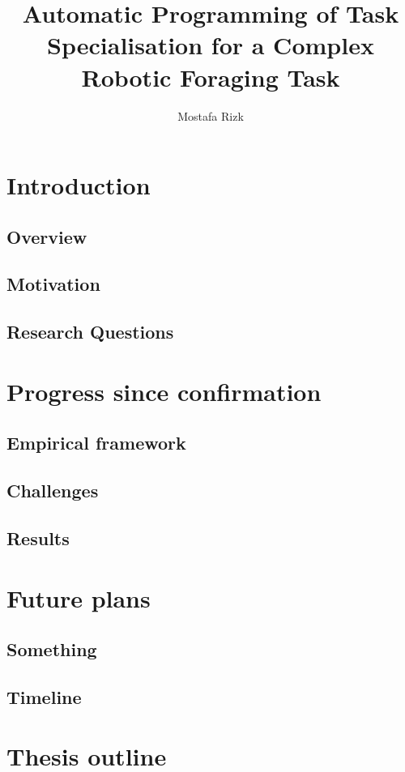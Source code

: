 \documentclass[11pt]{report}
\title{Automatic Programming of Task Specialisation for a Complex Robotic Foraging Task}
\author{Mostafa Rizk}
\begin{document}
\maketitle
\tableofcontents

\chapter{Introduction}
\section{Overview}
\section{Motivation}
\section{Research Questions}
\chapter{Progress since confirmation}
\section{Empirical framework}
\section{Challenges}
\section{Results}
\chapter{Future plans}
\section{Something}
\section{Timeline}
\chapter{Thesis outline}



\end{document}
